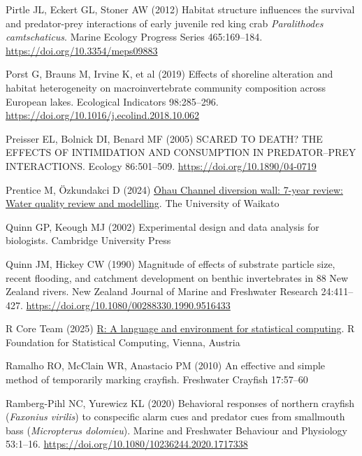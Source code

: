 \documentclass[
  12pt,
  a4paper,
]{scrbook}
\newlength{\cslhangindent}
\newenvironment{CSLReferences}[2] %
 {\begin{list}{}{%
  \setlength{\itemindent}{0pt}
  \setlength{\leftmargin}{0pt}
  \setlength{\parsep}{0pt}
  \ifodd #1
   \setlength{\leftmargin}{\cslhangindent}
   \setlength{\itemindent}{-1\cslhangindent}
  \fi
  \setlength{\itemsep}{#2\baselineskip}}}
 {\end{list}}
\begin{document}
\begin{CSLReferences}{1}{1}
Pirtle JL, Eckert GL, Stoner AW (2012) Habitat structure influences the
survival and predator-prey interactions of early juvenile red king crab
{\emph{Paralithodes camtschaticus}}. Marine Ecology Progress Series
465:169--184. \url{https://doi.org/10.3354/meps09883}

Porst G, Brauns M, Irvine K, et al (2019) Effects of shoreline
alteration and habitat heterogeneity on macroinvertebrate community
composition across {European} lakes. Ecological Indicators 98:285--296.
\url{https://doi.org/10.1016/j.ecolind.2018.10.062}

Preisser EL, Bolnick DI, Benard MF (2005) SCARED TO DEATH? THE EFFECTS
OF INTIMIDATION AND CONSUMPTION IN PREDATOR--PREY INTERACTIONS. Ecology
86:501--509. \url{https://doi.org/10.1890/04-0719}

Prentice M, Özkundakci D (2024)
\href{https://doi.org/10.15663/eri.report.169}{{Ōhau Channel} diversion
wall: 7-year review: Water quality review and modelling}. The University
of Waikato

Quinn GP, Keough MJ (2002) Experimental design and data analysis for
biologists. Cambridge University Press

Quinn JM, Hickey CW (1990) Magnitude of effects of substrate particle
size, recent flooding, and catchment development on benthic
invertebrates in 88 {New Zealand} rivers. New Zealand Journal of Marine
and Freshwater Research 24:411--427.
\url{https://doi.org/10.1080/00288330.1990.9516433}

R Core Team (2025) \href{https://www.R-project.org/}{{R}: A language and
environment for statistical computing}. R Foundation for Statistical
Computing, Vienna, Austria

Ramalho RO, McClain WR, Anastacio PM (2010) An effective and simple
method of temporarily marking crayfish. Freshwater Crayfish 17:57--60

Ramberg-Pihl NC, Yurewicz KL (2020) Behavioral responses of northern
crayfish ({\emph{Faxonius virilis}}) to conspecific alarm cues and
predator cues from smallmouth bass ({\emph{Micropterus dolomieu}}).
Marine and Freshwater Behaviour and Physiology 53:1--16.
\url{https://doi.org/10.1080/10236244.2020.1717338}


\end{CSLReferences}
\end{document}
